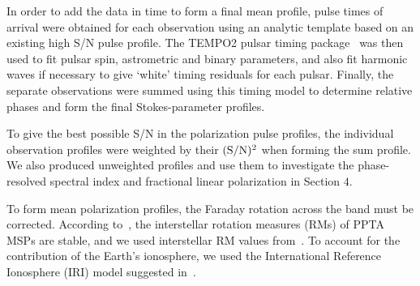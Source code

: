 \documentclass[useAMS,usenatbib]{mn2e}
\begin{document}
In order to add the data in time to form a final mean profile, pulse times of arrival 
were obtained for each observation using an analytic template based on an existing 
high S/N pulse profile. The TEMPO2 pulsar timing package~\citep{Hobbs06}  
was then used to fit pulsar spin, astrometric and binary parameters, and also fit 
harmonic waves if necessary to give ‘white’ timing residuals for each pulsar. Finally, 
the separate observations were summed using this timing model to determine relative 
phases and form the final Stokes-parameter profiles. 
%

To give the best possible S/N in the polarization pulse profiles, the individual 
observation profiles were weighted by their $(\rm{S/N})^2$ when forming the sum profile. 
%
We also produced unweighted profiles and use them to investigate the phase-resolved 
spectral index and fractional linear polarization in Section $4$.

To form mean polarization profiles, the Faraday rotation across the band must be 
corrected. 
%
According to~\citet{Yan11b}, the interstellar rotation measures (RMs) of PPTA MSPs 
are stable, and we used interstellar RM values from~\citet{Yan11}.
%
To account for the contribution of the Earth's ionosphere, we used the International 
Reference Ionosphere (IRI) model suggested in~\citet{Yan11b}. 
%
%
\end{document}
